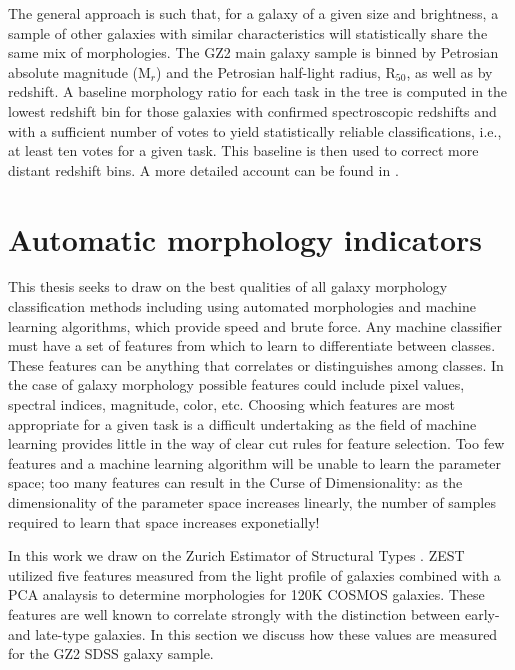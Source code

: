 The general approach is such that, for a galaxy of a given size and brightness, a sample of other galaxies with similar characteristics will statistically share the same mix of morphologies. The GZ2 main galaxy sample is binned by Petrosian absolute magnitude (M$_r$) and the Petrosian half-light radius, R$_{50}$,  as well as by redshift. A baseline morphology ratio for each task in the tree is computed in the lowest redshift bin for those galaxies with confirmed spectroscopic redshifts and with a sufficient number of votes to yield statistically reliable classifications, i.e., at least ten votes for a given task. This baseline is then used to correct more distant redshift bins. A more detailed account can be found in \cite{Willett2013}.


\section{Automatic morphology indicators}
This thesis seeks to draw on the best qualities of all galaxy morphology classification methods including using automated morphologies and machine learning algorithms, which provide speed and brute force. Any machine classifier must have a set of features from which to learn to differentiate between classes. These features can be anything that correlates or distinguishes among classes. In the case of galaxy morphology possible features could include pixel values, spectral indices, magnitude, color, etc. Choosing which features are most appropriate for a given task is a difficult undertaking as the field of machine learning provides little in the way of clear cut rules for feature selection. Too few features and a machine learning algorithm will be unable to learn the parameter space; too many features can result in the Curse of Dimensionality: as the dimensionality of the parameter space increases linearly, the number of samples required to learn that space increases exponetially! 

In this work we draw on the Zurich Estimator of Structural Types \citep[ZEST,][]{Scarlata2007}. ZEST utilized five features measured from the light profile of galaxies combined with a PCA analaysis to determine morphologies for 120K COSMOS galaxies. These features are well known to correlate strongly with the distinction between early- and late-type galaxies. In this section we discuss how these values are measured for the GZ2 SDSS galaxy sample. 

